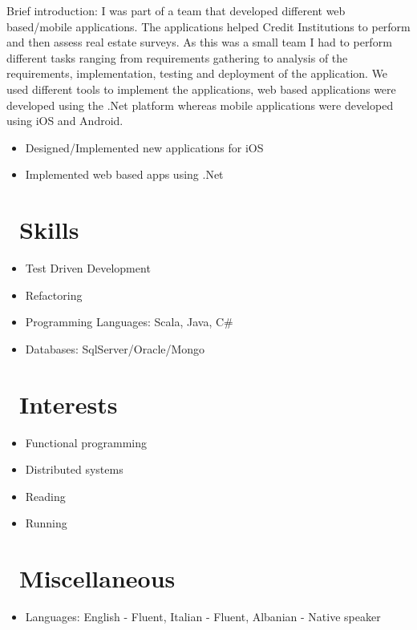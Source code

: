 \documentclass{resume}
\begin{document}
Brief introduction: I was part of a team that developed different web based/mobile applications.
The applications helped Credit Institutions to perform and then assess real estate surveys.
As this was a small team I had to perform different tasks ranging from requirements gathering to analysis of the requirements, implementation, testing and deployment of the application.
We used different tools to implement the applications, web based applications were developed using the .Net platform whereas mobile applications were developed using iOS and Android.

\begin{itemize}
  \item Designed/Implemented new applications for iOS
  \item Implemented web based apps using .Net
\end{itemize}


\section{\faCogs\ Skills}
\begin{itemize}[parsep=0.5ex]
  \item Test Driven Development
  \item Refactoring
  \item Programming Languages: Scala, Java, C\#
  \item Databases: SqlServer/Oracle/Mongo
\end{itemize}

\section{\faHeartO\ Interests}
\begin{itemize}[parsep=0.5ex]
  \item Functional programming
  \item Distributed systems
  \item Reading
  \item Running
\end{itemize}

\section{\faInfo\ Miscellaneous}
\begin{itemize}[parsep=0.5ex]
  \item Languages: English - Fluent, Italian - Fluent, Albanian - Native speaker
\end{itemize}

%
%
\end{document}
